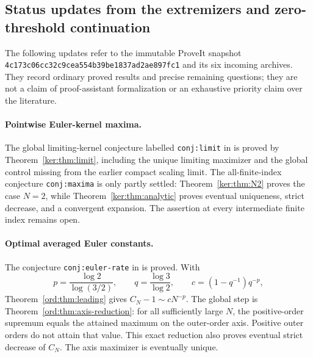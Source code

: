 
\subsection*{Status updates from the extremizers and zero-threshold continuation}

The following updates refer to the immutable ProveIt snapshot
\texttt{4c173c06cc32c9cea554b39be1837ad2ae897fc1} and its six incoming
archives. They record ordinary proved results and precise remaining
questions; they are not a claim of proof-assistant formalization or an
exhaustive priority claim over the literature.

\paragraph{Pointwise Euler-kernel maxima.}
The global limiting-kernel conjecture labelled \texttt{conj:limit}
in \cite[Section 8]{IncomingSharp} is proved by
Theorem~\ref{ker:thm:limit}, including the unique limiting maximizer
and the global control missing from the earlier compact scaling limit.
The all-finite-index conjecture \texttt{conj:maxima} is only partly
settled: Theorem~\ref{ker:thm:N2} proves the case $N=2$, while
Theorem~\ref{ker:thm:analytic} proves eventual uniqueness, strict decrease,
and a convergent expansion. The assertion at every intermediate finite
index remains open.

\paragraph{Optimal averaged Euler constants.}
The conjecture \texttt{conj:euler-rate} in
\cite[Section 9]{IncomingBounds} is proved. With
\[
 p=\frac{\log2}{\log(3/2)},\qquad
 q=\frac{\log3}{\log2},\qquad c=(1-q^{-1})q^{-p},
\]
Theorem~\ref{ord:thm:leading} gives $C_N-1\sim cN^{-p}$.
The global step is Theorem~\ref{ord:thm:axis-reduction}: for all
sufficiently large $N$, the positive-order supremum equals the attained
maximum on the outer-order axis. Positive outer orders do not attain
that value. This exact reduction also proves eventual strict decrease
of $C_N$. The axis maximizer is eventually unique.

